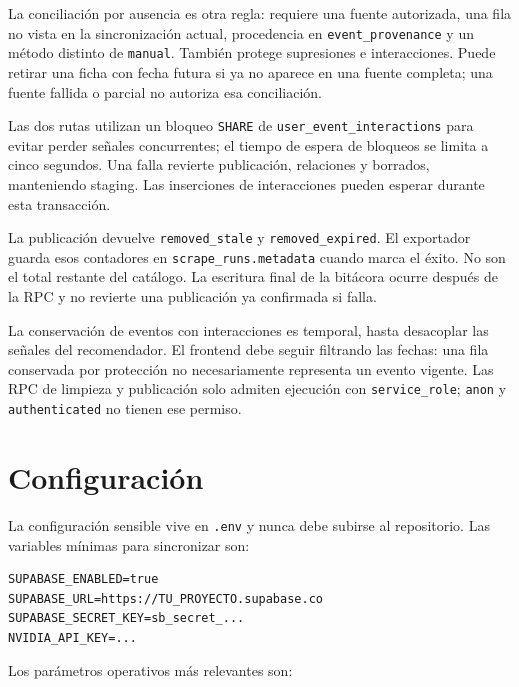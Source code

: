 \documentclass[11pt,a4paper]{article}
\begin{document}
La conciliaci\'{o}n por ausencia es otra regla: requiere una fuente autorizada, una fila no vista en la sincronizaci\'{o}n actual, procedencia en \texttt{event\_provenance} y un m\'{e}todo distinto de \texttt{manual}. Tambi\'{e}n protege supresiones e interacciones. Puede retirar una ficha con fecha futura si ya no aparece en una fuente completa; una fuente fallida o parcial no autoriza esa conciliaci\'{o}n.

Las dos rutas utilizan un bloqueo \texttt{SHARE} de \texttt{user\_event\_interactions} para evitar perder se\~{n}ales concurrentes; el tiempo de espera de bloqueos se limita a cinco segundos. Una falla revierte publicaci\'{o}n, relaciones y borrados, manteniendo staging. Las inserciones de interacciones pueden esperar durante esta transacci\'{o}n.

La publicaci\'{o}n devuelve \texttt{removed\_stale} y \texttt{removed\_expired}. El exportador guarda esos contadores en \texttt{scrape\_runs.metadata} cuando marca el \'{e}xito. No son el total restante del cat\'{a}logo. La escritura final de la bit\'{a}cora ocurre despu\'{e}s de la RPC y no revierte una publicaci\'{o}n ya confirmada si falla.

La conservaci\'{o}n de eventos con interacciones es temporal, hasta desacoplar las se\~{n}ales del recomendador. El frontend debe seguir filtrando las fechas: una fila conservada por protecci\'{o}n no necesariamente representa un evento vigente. Las RPC de limpieza y publicaci\'{o}n solo admiten ejecuci\'{o}n con \texttt{service\_role}; \texttt{anon} y \texttt{authenticated} no tienen ese permiso.

\section{Configuraci\'{o}n}

La configuraci\'{o}n sensible vive en \texttt{.env} y nunca debe subirse al repositorio. Las variables m\'{i}nimas para sincronizar son:

\begin{lstlisting}
SUPABASE_ENABLED=true
SUPABASE_URL=https://TU_PROYECTO.supabase.co
SUPABASE_SECRET_KEY=sb_secret_...
NVIDIA_API_KEY=...
\end{lstlisting}

Los par\'{a}metros operativos m\'{a}s relevantes son:
\end{document}
